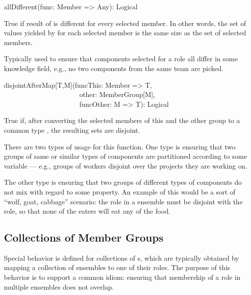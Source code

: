 \begin{dslsig}
allDifferent(func: Member => Any): Logical
\end{dslsig}
\begin{dsldesc}
    True if result of  is different for every selected member. In other
    words, the set of values yielded by  for each selected member is the
    same size as the set of selected members.

    Typically used to ensure that components selected for a role all differ in some
    knowledge field, e.g., no two components from the same team are picked.
\end{dsldesc}

\begin{dslsig}
disjointAfterMap[T,M](funcThis: Member => T, \\
~~~~~~~~~~~~~~~~~~~~~~other: MemberGroup[M], \\
~~~~~~~~~~~~~~~~~~~~~~funcOther: M => T): Logical
\end{dslsig}
\begin{dsldesc}
    True if, after converting the selected members of this and the other group to a
    common type , the resulting sets are disjoint.

    There are two types of usage for this function. One type is ensuring that two groups
    of same or similar types of components are partitioned according to some variable
    --- e.g., groups of workers disjoint over the projects they are working on.

    The other type is ensuring that two groups of different types of components do not
    mix with regard to some property. An example of this would be a sort of ``wolf,
    goat, cabbage'' scenario: the  role in a 
    ensemble must be disjoint with the  role, so that none of the
    eaters will eat any of the food.
\end{dsldesc}


\subsection{Collections of Member Groups}

Special behavior is defined for collections of s, which are typically
obtained by mapping a collection of ensembles to one of their roles. The purpose of this
behavior is to support a common idiom: ensuring that membership of a role in multiple
ensembles does not overlap.

